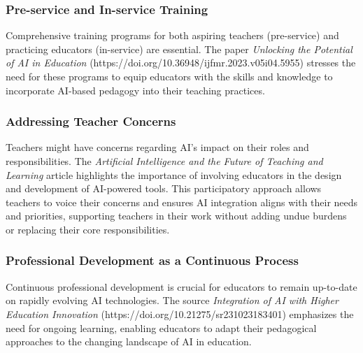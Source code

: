 \documentclass{article}
\begin{document}
\subsubsection{Pre-service and In-service Training}

Comprehensive training programs for both aspiring teachers (pre-service) and practicing educators (in-service) are essential. The paper \textit{Unlocking the Potential of AI in Education} (https://doi.org/10.36948/ijfmr.2023.v05i04.5955) stresses the need for these programs to equip educators with the skills and knowledge to incorporate AI-based pedagogy into their teaching practices.

\subsubsection{Addressing Teacher Concerns}

Teachers might have concerns regarding AI's impact on their roles and responsibilities. The \textit{Artificial Intelligence and the Future of Teaching and Learning} article highlights the importance of involving educators in the design and development of AI-powered tools. This participatory approach allows teachers to voice their concerns and ensures AI integration aligns with their needs and priorities, supporting teachers in their work without adding undue burdens or replacing their core responsibilities.

\subsubsection{Professional Development as a Continuous Process}

Continuous professional development is crucial for educators to remain up-to-date on rapidly evolving AI technologies. The source \textit{Integration of AI with Higher Education Innovation} (https://doi.org/10.21275/sr231023183401) emphasizes the need for ongoing learning, enabling educators to adapt their pedagogical approaches to the changing landscape of AI in education.






\newpage

\cite{einstein}




\end{document}
